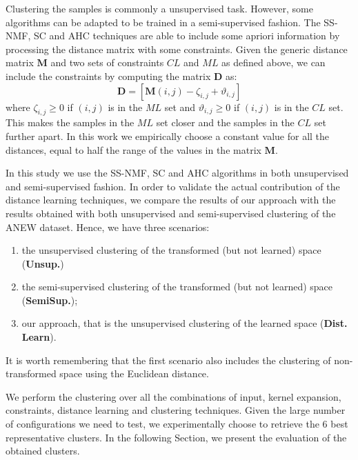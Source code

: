 Clustering the samples is commonly a unsupervised task. However, some algorithms can be adapted to be trained in a semi-supervised fashion. 
The SS-NMF, SC and AHC techniques are able to include some apriori information by processing the distance matrix with some constraints. Given the generic distance matrix $\mathbf{M}$ and two sets of constraints $CL$ and $ML$ as defined above, we can include the constraints by computing the matrix $\mathbf{D}$ as:
\begin{equation}
\mathbf{D}=[\mathbf{M}(i,j)- \zeta_{i,j} + \vartheta_{i,j}] 
\end{equation}
where $\zeta_{i,j}\geq 0$ if $(i,j)$ is in the $ML$ set and $\vartheta_{i,j}\geq 0$ if $(i,j)$ is in the $CL$ set. This makes the samples in the $ML$ set closer and the samples in the $CL$ set further apart. In this work we empirically choose a constant value for all the distances, equal to half the range of the values in the matrix $\mathbf{M}$.

In this study we use the SS-NMF, SC and AHC algorithms in both unsupervised and semi-supervised fashion. In order to validate the actual contribution of the distance learning techniques, we compare the results of our approach with the results obtained with both unsupervised and semi-supervised clustering of the ANEW dataset. Hence, we have three scenarios: 
\begin{enumerate}
\item the unsupervised clustering of the transformed (but not learned) space (\textbf{Unsup.}) 
\item the semi-supervised clustering of the transformed (but not learned) space (\textbf{SemiSup.}); 
\item our approach, that is the unsupervised clustering of the learned space (\textbf{Dist. Learn}).
\end{enumerate} 
It is worth remembering that the first scenario also includes the clustering of non-transformed space using the Euclidean distance. 

We perform the clustering over all the combinations of input, kernel expansion, constraints, distance learning and clustering techniques. Given the large number of configurations we need to test, we experimentally choose to retrieve the $6$ best representative clusters. In the following Section, we present the evaluation of the obtained clusters.

